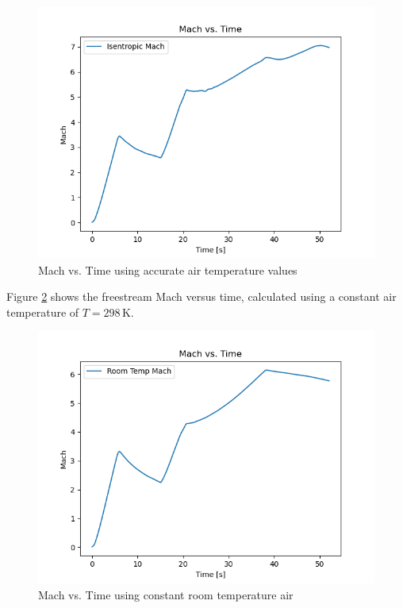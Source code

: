 \documentclass[../main.tex]{subfiles}
\begin{document}
\begin{figure}[h]
    \centering
    \includegraphics[scale=.7]{../../images/problem_1/Mach_correct_vs_Time.png}
    \caption{Mach vs. Time using accurate air temperature values}
    \label{Mach_correct}
\end{figure}

Figure \ref{Mach_298} shows the freestream Mach versus time, calculated using a constant air temperature of \(T=298\,\unit{\kelvin}\).

\begin{figure}[h]
    \centering
    \includegraphics[scale=.7]{../../images/problem_1/Mach_298_vs_Time.png}
    \caption{Mach vs. Time using constant room temperature air}
    \label{Mach_298}
\end{figure}
\end{document}
